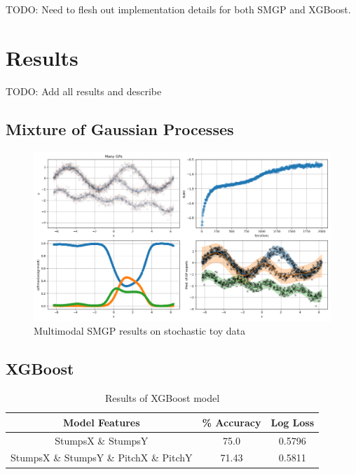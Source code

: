 \documentclass[12pt,a4paper]{report}
\theoremstyle{definition}
\begin{document}
TODO: Need to flesh out implementation details for both SMGP and XGBoost.

\chapter{Results}

TODO: Add all results and describe

\section{Mixture of Gaussian Processes}

\begin{figure}[H]
    \centering
    \includegraphics[width=\linewidth]{demo_tf2.png}
    \caption{Multimodal SMGP results on stochastic toy data}
    \label{fig:MultimodalSMGP}
\end{figure}

\section{XGBoost}

\begin{table}[H] \label{tab:XGResults}
	\centering
	\caption{Results of XGBoost model}
	\begin{tabular}{| c | c | c |} 
		\hline
		Model Features & \% Accuracy & Log Loss \\ [0.5ex] 
		\hline\hline
		StumpsX \& StumpsY & 75.0 & 0.5796 \\
		\hline
		StumpsX \& StumpsY \& PitchX \& PitchY & 71.43 & 0.5811 \\ [1ex]
		\hline
	\end{tabular}
\end{table}
\end{document}
